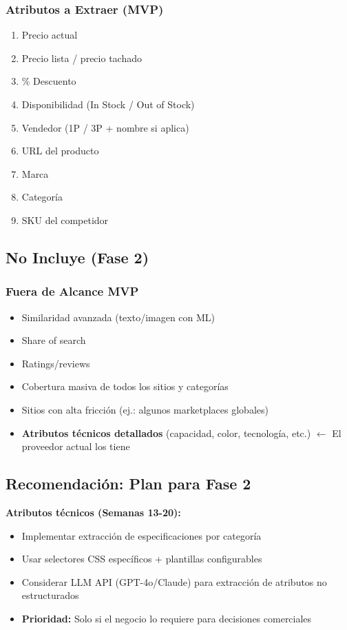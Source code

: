\documentclass[12pt,a4paper]{article}
\begin{document}
\subsubsection*{Atributos a Extraer (MVP)}
\begin{enumerate}[leftmargin=*]
    \item Precio actual
    \item Precio lista / precio tachado
    \item \% Descuento
    \item Disponibilidad (In Stock / Out of Stock)
    \item Vendedor (1P / 3P + nombre si aplica)
    \item URL del producto
    \item Marca
    \item Categoría
    \item SKU del competidor
\end{enumerate}

\subsection{No Incluye (Fase 2)}

\subsubsection*{Fuera de Alcance MVP}
\begin{itemize}[leftmargin=*]
    \item Similaridad avanzada (texto/imagen con ML)
    \item Share of search
    \item Ratings/reviews
    \item Cobertura masiva de todos los sitios y categorías
    \item Sitios con alta fricción (ej.: algunos marketplaces globales)
    \item \textbf{Atributos técnicos detallados} (capacidad, color, tecnología, etc.) $\leftarrow$ El proveedor actual los tiene
\end{itemize}

\subsection{Recomendación: Plan para Fase 2}

\textbf{Atributos técnicos (Semanas 13-20):}
\begin{itemize}[leftmargin=*]
    \item Implementar extracción de especificaciones por categoría
    \item Usar selectores CSS específicos + plantillas configurables
    \item Considerar LLM API (GPT-4o/Claude) para extracción de atributos no estructurados
    \item \textbf{Prioridad:} Solo si el negocio lo requiere para decisiones comerciales
\end{itemize}
\end{document}
